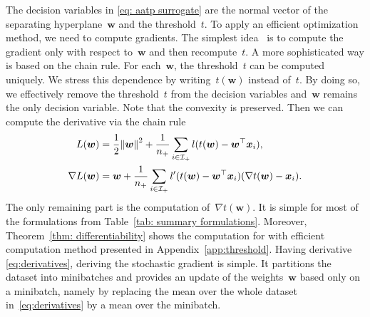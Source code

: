 The decision variables in \eqref{eq: aatp surrogate} are the normal vector of the separating hyperplane~$\bm{w}$ and the threshold~$t$. To apply an efficient optimization method, we need to compute gradients. The simplest idea~\cite{grill2016learning} is to compute the gradient only with respect to~$\bm{w}$ and then recompute~$t$. A more sophisticated way is based on the chain rule. For each~$\bm{w}$, the threshold~$t$ can be computed uniquely. We stress this dependence by writing~$t(\bm{w})$ instead of~$t$. By doing so, we effectively remove the threshold~$t$ from the decision variables and~$\bm{w}$ remains the only decision variable. Note that the convexity is preserved. Then we can compute the derivative via the chain rule
\begin{equation}\label{eq:derivatives}
  \begin{aligned}
  L(\bm{w})
    & = \frac{1}{2}\norm{\bm{w}}^2 + \frac{1}{\npos} \sum_{i \in \Ipos} l(t(\bm{w}) - \bm{w}^{\top} \bm{x}_i) , \\
  \nabla L(\bm{w})
    & = \bm{w} + \frac{1}{\npos} \sum_{i \in \Ipos} l'(t(\bm{w}) - \bm{w}^{\top} \bm{x}_i)(\nabla t(\bm{w}) - \bm{x}_i).
  \end{aligned}
\end{equation}
The only remaining part is the computation of~$\nabla t(\bm{w})$. It is simple for most of the formulations from Table~\ref{tab: summary formulations}. Moreover, Theorem~\ref{thm: differentiability} shows the computation for \PatMat with efficient computation method presented in Appendix~\ref{app:threshold}. Having derivative \eqref{eq:derivatives}, deriving the stochastic gradient is simple. It partitions the dataset into minibatches and provides an update of the weights~$\bm{w}$ based only on a minibatch, namely by replacing the mean over the whole dataset in~\eqref{eq:derivatives} by a mean over the minibatch.


